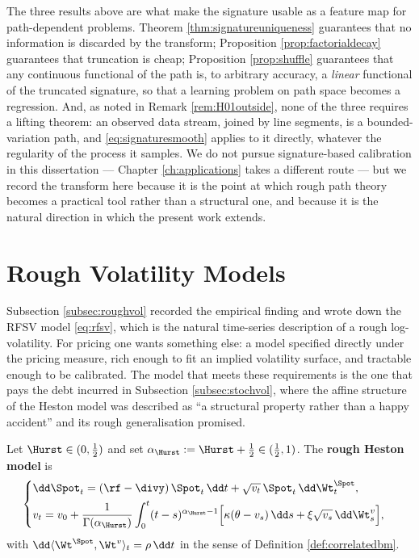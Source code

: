 \begin{remark}\label{rem:signaturecalibration}
The three results above are what make the signature usable as a feature map for path-dependent
problems. Theorem \ref{thm:signatureuniqueness} guarantees that no information is discarded by the
transform; Proposition \ref{prop:factorialdecay} guarantees that truncation is cheap; Proposition
\ref{prop:shuffle} guarantees that any continuous functional of the path is, to arbitrary accuracy,
a \emph{linear} functional of the truncated signature, so that a learning problem on path space
becomes a regression. And, as noted in Remark \ref{rem:H01outside}, none of the three requires a
lifting theorem: an observed data stream, joined by line segments, is a bounded-variation path, and
\eqref{eq:signaturesmooth} applies to it directly, whatever the regularity of the process it
samples. We do not pursue signature-based calibration in this dissertation --- Chapter
\ref{ch:applications} takes a different route --- but we record the transform here because it is the point
at which rough path theory becomes a practical tool rather than a structural one, and because it is
the natural direction in which the present work extends.
\end{remark}



\section{Rough Volatility Models}\label{sec:roughvolmodels}

Subsection \ref{subsec:roughvol} recorded the empirical finding and wrote down the RFSV model
\eqref{eq:rfsv}, which is the natural time-series description of a rough log-volatility. For
pricing one wants something else: a model specified directly under the pricing measure, rich enough
to fit an implied volatility surface, and tractable enough to be calibrated. The model that meets
these requirements is the one that pays the debt incurred in Subsection \ref{subsec:stochvol}, where
the affine structure of the Heston model was described as ``a structural property rather than a
happy accident'' and its rough generalisation promised.

\begin{definition}\label{def:roughheston}
Let $\Hurst\in(0,\tfrac12)$ and set $\alpha_{\Hurst} := \Hurst + \tfrac12 \in (\tfrac12,1)$. The
\textbf{rough Heston model} is
\begin{equation}\label{eq:roughheston}
\begin{cases}
\dd \Spot_t = (\rf-\divy)\,\Spot_t\,\dd t + \sqrt{v_t}\,\Spot_t\,\dd \Wt^{\Spot}_t, \\[4pt]
\displaystyle v_t = v_0 + \frac{1}{\Gamma(\alpha_\Hurst)}\int_0^t (t-s)^{\alpha_\Hurst-1}
\Bigl[ \kappa(\theta - v_s)\,\dd s + \xi\sqrt{v_s}\,\dd \Wt^{v}_s \Bigr],
\end{cases}
\end{equation}
with $\dd\langle \Wt^{\Spot},\Wt^{v}\rangle_t = \rho\,\dd t$ in the sense of Definition
\ref{def:correlatedbm}.
\end{definition}

